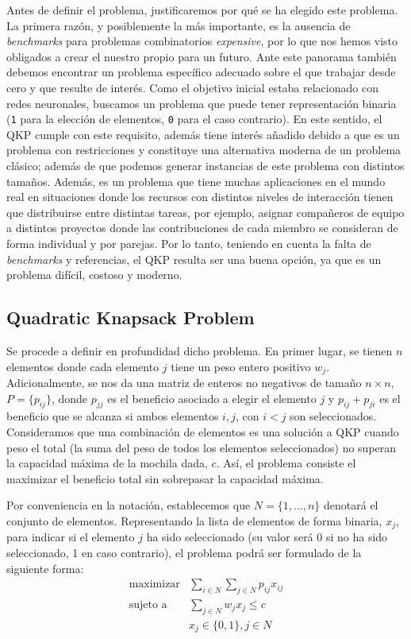 Antes de definir el problema, justificaremos por qué se ha elegido este problema. 
La primera razón, y posiblemente la más importante, es la ausencia de \textit{benchmarks} para problemas combinatorios \textit{expensive}, por lo que nos hemos visto obligados a crear el nuestro propio para un futuro. 
Ante este panorama también debemos encontrar un problema específico adecuado sobre el que trabajar desde cero y que resulte de interés. 
Como el objetivo inicial estaba relacionado con redes neuronales, buscamos un problema que puede tener representación binaria (\texttt{1} para la elección de elementos, \texttt{0} para el caso contrario). 
En este sentido, el QKP cumple con este requisito, además tiene interés añadido debido a que es un problema con restricciones y constituye una alternativa moderna de un problema clásico; además de que podemos generar instancias de este problema con distintos tamaños. 
Además, es un problema que tiene muchas aplicaciones en el mundo real en situaciones donde los recursos con distintos niveles de interacción tienen que distribuirse entre distintas tareas, por ejemplo, asignar compañeros de equipo a distintos proyectos donde las contribuciones de cada miembro se consideran de forma individual y por parejas. 
Por lo tanto, teniendo en cuenta la falta de \textit{benchmarks} y referencias, el QKP resulta ser una buena opción, ya que es un problema difícil, costoso y moderno. 


\subsection{Quadratic Knapsack Problem}
Se procede a definir en profundidad dicho problema. 
En primer lugar, se tienen $n$ elementos donde cada elemento $j$ tiene un peso entero positivo $w_j$. 
Adicionalmente, se nos da una matriz de enteros no negativos de tamaño $n\times n$, $P = \{p_{ij}\}$, donde $p_{jj}$ es el beneficio asociado a elegir el elemento $j$ y $p_{ij}+p_{ji}$ es el beneficio que se alcanza si ambos elementos $i,j$, con $i<j$ son seleccionados. 
Consideramos que una combinación de elementos es una solución a QKP cuando peso el total (la suma del peso de todos los elementos seleccionados) no superan la capacidad máxima de la mochila dada, $c$. 
Así, el problema consiste el maximizar el beneficio total sin sobrepasar la capacidad máxima.

Por conveniencia en la notación, establecemos que $N=\{1,\dots,n\}$ denotará el conjunto de elementos. 
Representando la lista de elementos de forma binaria, $x_j$, para indicar si el elemento $j$ ha sido seleccionado (su valor será 0 si no ha sido seleccionado, 1 en caso contrario), el problema podrá ser formulado de la siguiente forma:
\begin{equation}
\begin{aligned}
  \text{maximizar} & \sum_{i\in N}\sum_{j\in N}p_{ij}x_{ij} \\
  \text{sujeto a } & \sum_{j\in N}w_jx_j \leq c\\
  & x_j\in \{0,1\}, j \in N 
\end{aligned}
\label{eq:QKP}
\end{equation}

